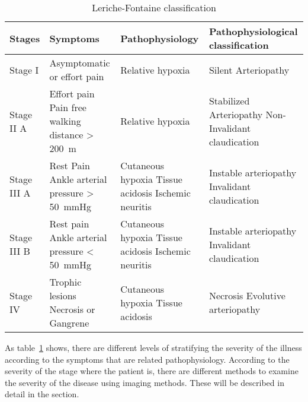 \begin{table}
\caption{Leriche-Fontaine classification}
\centering
\label{table:Fontaine}
\begin{tabular}{p{1.8cm} p{3.8cm} p{3.5cm} p{4.5cm}}
\toprule
\textbf{Stages}& \textbf{Symptoms} & \textbf{Pathophysiology} & \textbf{Pathophysiological \newline classification} \\
\midrule
Stage I & Asymptomatic \newline or effort pain & Relative hypoxia & Silent Arteriopathy \\
\midrule
Stage II A & Effort pain \newline Pain free walking distance > \SI{200}{\meter} & Relative hypoxia & Stabilized Arteriopathy \newline Non-Invalidant claudication \\ 
\midrule
Stage III A & Rest Pain \newline Ankle arterial pressure > \SI{50}{\mmHg} & Cutaneous hypoxia \newline Tissue acidosis \newline Ischemic neuritis & Instable arteriopathy \newline Invalidant claudication \\
\midrule
Stage III B & Rest pain \newline Ankle arterial pressure < \SI{50}{\mmHg} & Cutaneous hypoxia \newline Tissue acidosis \newline Ischemic neuritis & Instable arteriopathy \newline
Invalidant claudication \\
\midrule
Stage IV & Trophic lesions \newline Necrosis or Gangrene & Cutaneous hypoxia \newline 
Tissue acidosis & Necrosis \newline Evolutive arteriopathy \\
\bottomrule
\end{tabular}
\end{table}

As table~\ref{table:Fontaine} shows, there are different levels of stratifying the severity of the illness according to the symptoms that are related pathophysiology. According to the severity of the stage where the patient is, there are different methods to examine the severity of the disease using imaging methods. These will be described in detail in the section.
  

